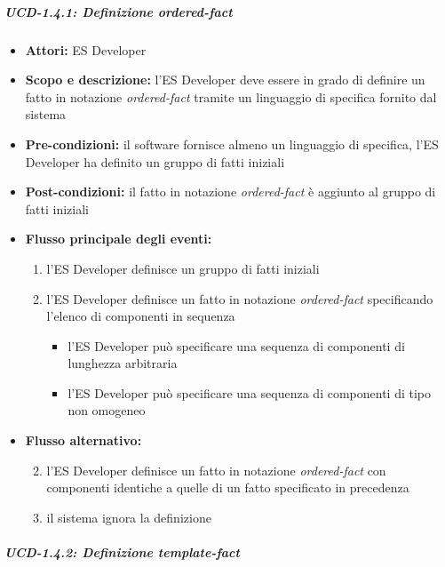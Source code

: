 \subparagraph{UCD-1.4.1: Definizione ordered-fact} %

\begin{itemize}
	\item \textbf{Attori:} ES Developer
	\item \textbf{Scopo e descrizione:}  l'ES Developer deve essere in grado di definire un fatto in notazione \emph{ordered-fact} tramite un linguaggio di specifica fornito dal sistema
	\item \textbf{Pre-condizioni:} il software fornisce almeno un linguaggio di specifica, l'ES Developer ha definito un gruppo di fatti iniziali
	\item \textbf{Post-condizioni:} il fatto in notazione \emph{ordered-fact} è aggiunto al gruppo di fatti iniziali
	\item \textbf{Flusso principale degli eventi:}
		\begin{enumerate}
			\item l'ES Developer definisce un gruppo di fatti iniziali
			\item l'ES Developer definisce un fatto in notazione \emph{ordered-fact} specificando l'elenco di componenti in sequenza
				\begin{itemize}
					\item l'ES Developer può specificare una sequenza di componenti di lunghezza arbitraria
					\item l'ES Developer può specificare una sequenza di componenti di tipo non omogeneo
				\end{itemize}
		\end{enumerate}
	\item \textbf{Flusso alternativo:}
		\begin{enumerate}
			\setcounter{enumi}{1}
			\item l'ES Developer definisce un fatto in notazione \emph{ordered-fact} con componenti identiche a quelle di un fatto specificato in precedenza
			\item il sistema ignora la definizione
		\end{enumerate}
\end{itemize}


\subparagraph{UCD-1.4.2: Definizione template-fact} %

